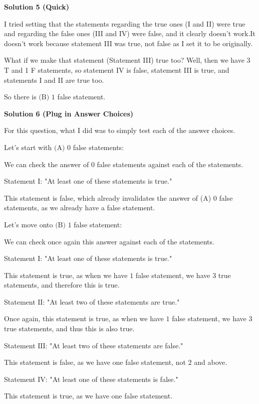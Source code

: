 \begin{enumerate}
\textbf{Solution 5 (Quick)}

I tried setting that the statements regarding the true ones (I and II) were true and regarding the false ones (III and IV) were false, and it clearly doesn't work.It doesn't work because statement III was true, not false as I set it to be originally.

 What if we make that statement (Statement III) true too? Well, then we have 3 T and 1 F statements, so statement IV is false, statement III is true, and statements I and II are true too.

 So there is $\boxed{\text{(B) }1}$ false statement.

 



\textbf{Solution 6 (Plug in Answer Choices)}

For this question, what I did was to simply test each of the answer choices. 

 Let's start with $\text{(A)}$ $0$ false statements:

 We can check the answer of $0$ false statements against each of the statements.

 Statement $\mathrm{I}$: "At least one of these statements is true."

 This statement is false, which already invalidates the answer of (A) 0 false statements, as we already have a false statement. 

 Let's move onto $\text{(B)}$ $1$ false statement:

 We can check once again this answer against each of the statements.

 Statement $\mathrm{I}$: "At least one of these statements is true."

 This statement is true, as when we have $1$ false statement, we have $3$ true statements, and therefore this is true.

 Statement $\mathrm{II}$: "At least two of these statements are true."

 Once again, this statement is true, as when we have $1$ false statement, we have $3$ true statements, and thus this is also true.

 Statement $\mathrm{III}$: "At least two of these statements are false."

 This statement is false, as we have one false statement, not $2$ and above.

 Statement $\mathrm{IV}$: "At least one of these statements is false."

 This statement is true, as we have one false statement.


\end{enumerate}
